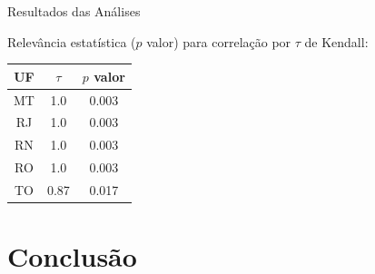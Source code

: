 \documentclass[10pt,brazil]{beamer}
\theoremstyle{definition}
\begin{document}
    \begin{frame}{Resultados das Análises}


  Relevância estatística ($p$ valor) para correlação por $\tau$ de Kendall:
    \begin{table}[]
      \begin{tabular}{ccc}
      \hline
      \multicolumn{1}{c}{\textbf{UF}} & \multicolumn{1}{c}{\textbf{$\tau$}} & \multicolumn{1}{c}{\textbf{$p$ valor}} \\ \hline
      MT                              & 1.0                         & 0.003                            \\
      RJ                              & 1.0                         & 0.003                            \\
      RN                              & 1.0                         & 0.003                            \\
      RO                              & 1.0                         & 0.003                            \\
      TO                              & 0.87                         & 0.017                            \\ \hline
      \end{tabular}
      \end{table}
\end{frame}

\section{Conclusão}
\end{document}
